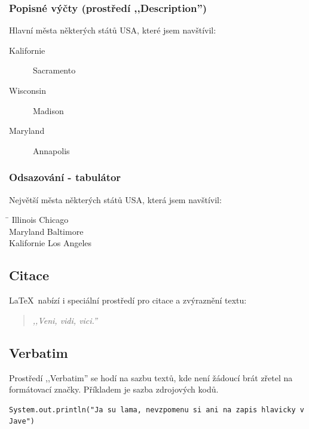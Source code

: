 \documentclass[12pt,a4paper,oneside]{article}
\numberwithin{equation}{section} %
\numberwithin{figure}{section} %
\numberwithin{table}{section} %
\begin{document}
\subsubsection{Popisné výčty (prostředí ,,Description'')}
Hlavní města některých států USA, které jsem navštívil:
\begin{description}
\item[Kalifornie] Sacramento
\item[Wisconsin] Madison
\item[Maryland] Annapolis
\end{description}

\subsubsection{Odsazování - tabulátor}
Největší města některých států USA, která jsem navštívil:
\begin{tabbing} %
\hspace{5cm}\=\kill %
Illinois \> Chicago \\ %
Maryland \> Baltimore \\ 
Kalifornie \> Los Angeles 
\end{tabbing} 

\subsection{Citace}
\LaTeX ~nabízí i speciální prostředí pro citace a zvýraznění textu:
\begin{quote} %
\emph{,,Veni, vidi, vici.''} %
\end{quote}

\subsection{Verbatim}
Prostředí ,,Verbatim'' se hodí na sazbu textů, kde není žádoucí brát zřetel na formátovací značky. Příkladem je sazba zdrojových kodů.
\begin{verbatim}
System.out.println("Ja su lama, nevzpomenu si ani na zapis hlavicky v Jave")
\end{verbatim}
\end{document}
